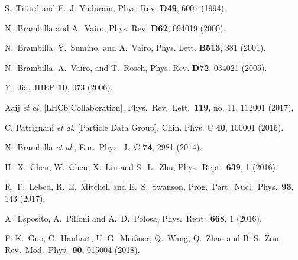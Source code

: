\documentclass[twocolumn,showpacs,superscriptaddress,preprintnumbers,nofootinbib,prd]{revtex4-1}
\begin{document}
\begin{thebibliography}{}
S.~Titard and F.~J. Yndurain,
Phys. Rev. {\bf D49}, 6007 (1994).

N.~Brambilla and A.~Vairo, %
Phys. Rev. {\bf D62}, 094019 (2000).

N.~Brambilla, Y.~Sumino, and A.~Vairo, %
Phys. Lett. {\bf B513}, 381 (2001).

N.~Brambilla, A.~Vairo, and T.~Rosch,
Phys. Rev. {\bf D72}, 034021 (2005).

Y.~Jia, %
JHEP {\bf 10}, 073 (2006).

 Aaij {\it et al.} [LHCb Collaboration],
 Phys.\ Rev.\ Lett.\  {\bf 119}, no. 11, 112001 (2017).

  C. Patrignani {\it et al.} [Particle Data Group],
  Chin. Phys. C {\bf 40}, 100001 (2016).

  N.~Brambilla {\it et al.},
  Eur.\ Phys.\ J.\ C {\bf 74}, 2981 (2014).

  H.~X.~Chen, W.~Chen, X.~Liu and S.~L.~Zhu,
  Phys.\ Rept.\  {\bf 639}, 1 (2016).

  R.~F.~Lebed, R.~E.~Mitchell and E.~S.~Swanson,
  Prog.\ Part.\ Nucl.\ Phys.\  {\bf 93}, 143 (2017).

  A.~Esposito, A.~Pilloni and A.~D.~Polosa,
  Phys.\ Rept.\  {\bf 668}, 1 (2016).

  F.-K.~Guo, C.~Hanhart, U.-G.~Mei{\ss}ner, Q.~Wang, Q.~Zhao and B.-S.~Zou,
  Rev.\ Mod.\ Phys.\  {\bf 90}, 015004 (2018).


\end{thebibliography}
\end{document}
